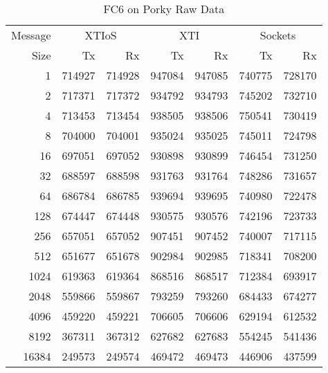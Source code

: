 \documentclass[letterpaper,final,notitlepage,twocolumn,10pt,twoside]{article}
\begin{document}
\begin{appendix}
\begin{table}[hbp]
\footnotesize
\begin{center}
\setlength{\tabcolsep}{0.3em}
\setlength{\arraycolsep}{0.3em}
\begin{tabular}{rrrrrrr}\\
Message & \multicolumn{2}{c}{XTIoS} & \multicolumn{2}{c}{XTI} & \multicolumn{2}{c}{Sockets}\\
Size & Tx & Rx & Tx & Rx & Tx & Rx\\
\hline
\hline
1 & 714927 & 714928 & 947084 & 947085 & 740775 & 728170\\
2 & 717371 & 717372 & 934792 & 934793 & 745202 & 732710\\
4 & 713453 & 713454 & 938505 & 938506 & 750541 & 730419\\
8 & 704000 & 704001 & 935024 & 935025 & 745011 & 724798\\
16 & 697051 & 697052 & 930898 & 930899 & 746454 & 731250\\
32 & 688597 & 688598 & 931763 & 931764 & 748286 & 731657\\
64 & 686784 & 686785 & 939694 & 939695 & 740980 & 722478\\
128 & 674447 & 674448 & 930575 & 930576 & 742196 & 723733\\
256 & 657051 & 657052 & 907451 & 907452 & 740007 & 717115\\
512 & 651677 & 651678 & 902984 & 902985 & 718341 & 708200\\
1024 & 619363 & 619364 & 868516 & 868517 & 712384 & 693917\\
2048 & 559866 & 559867 & 793259 & 793260 & 684433 & 674277\\
4096 & 459220 & 459221 & 706605 & 706606 & 629194 & 612532\\
8192 & 367311 & 367312 & 627682 & 627683 & 554245 & 541436\\
16384 & 249573 & 249574 & 469472 & 469473 & 446906 & 437599\\
\hline
\end{tabular}
\end{center}
\normalsize
\caption[FC6 on Porky Raw Data]{FC6 on Porky Raw Data}
\label{table:fc6data}
\end{table}


\end{appendix}
\end{document}
